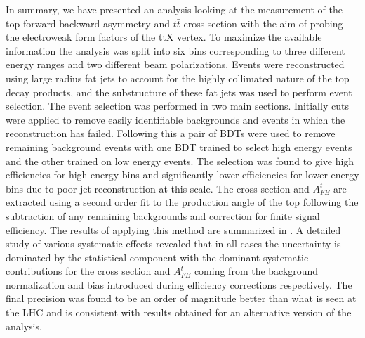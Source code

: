 In summary, we have presented an analysis looking at the measurement of the top forward backward asymmetry and $t\bar{t}$ cross section with the aim of probing the electroweak form factors of the ttX vertex. To maximize the available information the analysis was split into six bins corresponding to three different energy ranges and two different beam polarizations. Events were reconstructed using large radius fat jets to account for the highly collimated nature of the top decay products, and the substructure of these fat jets was used to perform event selection. The event selection was performed in two main sections. Initially cuts were applied to remove easily identifiable backgrounds and events in which the reconstruction has failed. Following this a pair of \ac{BDT}s were used to remove remaining background events with one \ac{BDT} trained to select high energy events and the other trained on low energy events. The selection was found to give high efficiencies for high energy bins and significantly lower efficiencies for lower energy bins due to poor jet reconstruction at this scale. The cross section and $A_{FB}^t$ are extracted using a second order fit to the production angle of the top following the subtraction of any remaining backgrounds and correction for finite signal efficiency. The results of applying this method are summarized in . A detailed study of various systematic effects revealed that in all cases the uncertainty is dominated by the statistical component with the dominant systematic contributions for the cross section and $A_{FB}^t$ coming from the background normalization and bias introduced during efficiency corrections respectively. The final precision was found to be an order of magnitude better than what is seen at the \ac{LHC}\cite{Bai:2011uk} and is consistent with results obtained for an alternative version of the analysis\cite{TopPaperDraft}.

